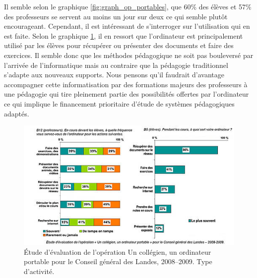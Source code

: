 Il semble selon le graphique \ref{fig:graph_op_portables}\cite{portables60}, que
60\% des élèves et 57\% des professeurs se servent au moins un jour
sur deux ce qui semble plutôt encourageant. Cependant, il est
intéressant de s'interroger sur l'utilisation qui en est faite. Selon
le graphique \ref{fig:graph_op_portables2}, il en ressort que
l'ordinateur est principalement utilisé par les élèves pour
récupérer ou présenter des documents et faire des exercices. Il semble
donc que les méthodes pédagogique ne soit pas bouleversé par l'arrivée
de l'informatique mais au contraire que la pédagogie traditionnel
s'adapte aux nouveaux supports. Nous pensons qu'il faudrait d'avantage
accompagner cette informatisation par des formations majeurs des
professeurs à une pédagogie qui tire pleinement partie des
possibilités offertes par l'ordinateur ce qui implique le financement
prioritaire d'étude de systèmes pédagogiques adaptés.


\begin{figure}[h]
	\begin{center}
		\includegraphics[width=\textwidth]{../resources/illustrations/usage_portables_act}
	\caption{Étude d'évaluation de l'opération \og Un collégien,
          un ordinateur portable \fg{} pour le Conseil général des
          Landes, 2008--2009. Type d'activité.}
	\label{fig:graph_op_portables2}
	\end{center}
\end{figure}


